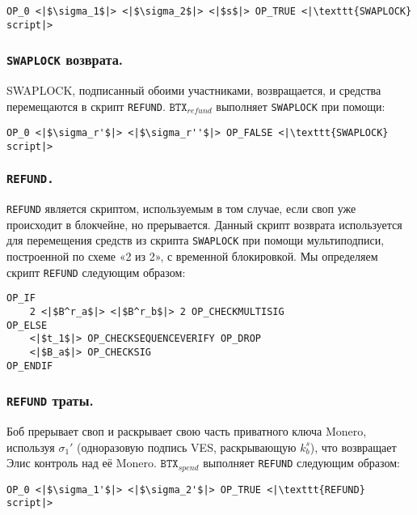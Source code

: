 \documentclass{llncs}
\newcommand{\BTX}{\texttt{BTX}}
\begin{document}
\begin{verbatim}
OP_0 <|$\sigma_1$|> <|$\sigma_2$|> <|$s$|> OP_TRUE <|\texttt{SWAPLOCK} script|>
\end{verbatim}

\subsubsection{\texttt{SWAPLOCK} возврата.}
SWAPLOCK, подписанный обоими участниками, возвращается, и средства перемещаются в скрипт \texttt{REFUND}. $\BTX_\textit{refund}$ выполняет \texttt{SWAPLOCK} при помощи:

\begin{verbatim}
OP_0 <|$\sigma_r'$|> <|$\sigma_r''$|> OP_FALSE <|\texttt{SWAPLOCK} script|>
\end{verbatim}

\subsubsection{\texttt{REFUND.}}
\texttt{REFUND} является скриптом, используемым в том случае, если своп уже происходит в блокчейне, но прерывается. Данный скрипт возврата используется для перемещения средств из скрипта \texttt{SWAPLOCK} при помощи мультиподписи, построенной по схеме «2 из 2», с временной блокировкой. Мы определяем скрипт \texttt{REFUND} следующим образом:

\begin{verbatim}
OP_IF
    2 <|$B^r_a$|> <|$B^r_b$|> 2 OP_CHECKMULTISIG
OP_ELSE
    <|$t_1$|> OP_CHECKSEQUENCEVERIFY OP_DROP
    <|$B_a$|> OP_CHECKSIG
OP_ENDIF
\end{verbatim}

\subsubsection{\texttt{REFUND} траты.}
Боб прерывает своп и раскрывает свою часть приватного ключа Monero, используя $\sigma_1'$ (одноразовую подпись VES, раскрывающую $k^s_b$), что возвращает Элис контроль над её Monero. $\BTX_\textit{spend}$ выполняет \texttt{REFUND} следующим образом:

\begin{verbatim}
OP_0 <|$\sigma_1'$|> <|$\sigma_2'$|> OP_TRUE <|\texttt{REFUND} script|>
\end{verbatim}
\end{document}
